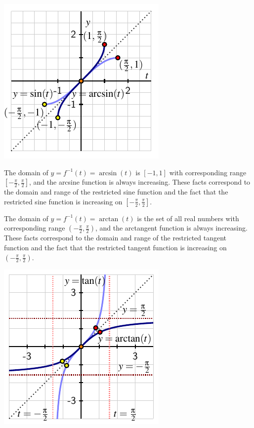 \documentclass{ximera}
\begin{document}
\begin{summary}
\begin{itemize}
\begin{image}
\includegraphics{inverse-trig-arcsin-graph.pdf}
\end{image}
\par
The domain of $y = f^{-1}(t) = \arcsin(t)$ is $[-1,1]$ with corresponding range $[-\frac{\pi}{2}, \frac{\pi}{2}]$, and the arcsine function is always increasing.  These facts correspond to the domain and range of the restricted sine function and the fact that the restricted sine function is increasing on $[-\frac{\pi}{2},\frac{\pi}{2}]$.%
\par
The domain of $y = f^{-1}(t) = \arctan(t)$ is the set of all real numbers with corresponding range $(-\frac{\pi}{2}, \frac{\pi}{2})$, and the arctangent function is always increasing.  These facts correspond to the domain and range of the restricted tangent function and the fact that the restricted tangent function is increasing on $(-\frac{\pi}{2},\frac{\pi}{2})$.%
\begin{image}
\includegraphics{inverse-trig-arctan-graph.pdf}
\end{image}
  \end{itemize}
\end{summary}
\end{document}
